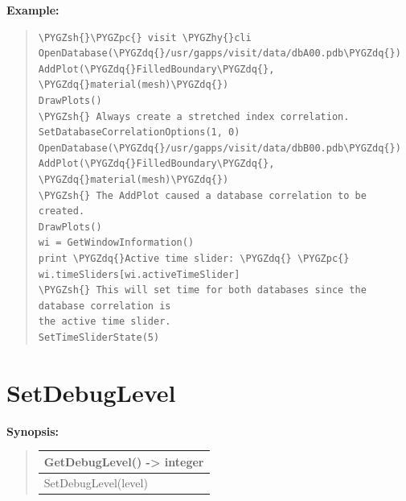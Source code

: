 \documentclass[letterpaper,10pt,english]{sphinxmanual}
\def\PYGZsh{\char`\#}
\def\PYGZpc{\char`\%}
\def\PYGZhy{\char`\-}
\def\PYGZdq{\char`\"}
\begin{document}
\begin{DUlineblock}{0em}
\item[] \textbf{Example:}
\item[] 
\end{DUlineblock}
\begin{quote}

\begin{Verbatim}[commandchars=\\\{\}]
\PYGZsh{}\PYGZpc{} visit \PYGZhy{}cli
OpenDatabase(\PYGZdq{}/usr/gapps/visit/data/dbA00.pdb\PYGZdq{})
AddPlot(\PYGZdq{}FilledBoundary\PYGZdq{}, \PYGZdq{}material(mesh)\PYGZdq{})
DrawPlots()
\PYGZsh{} Always create a stretched index correlation.
SetDatabaseCorrelationOptions(1, 0)
OpenDatabase(\PYGZdq{}/usr/gapps/visit/data/dbB00.pdb\PYGZdq{})
AddPlot(\PYGZdq{}FilledBoundary\PYGZdq{}, \PYGZdq{}material(mesh)\PYGZdq{})
\PYGZsh{} The AddPlot caused a database correlation to be created.
DrawPlots()
wi = GetWindowInformation()
print \PYGZdq{}Active time slider: \PYGZdq{} \PYGZpc{} wi.timeSliders[wi.activeTimeSlider]
\PYGZsh{} This will set time for both databases since the database correlation is
the active time slider.
SetTimeSliderState(5)
\end{Verbatim}
\end{quote}


\section{SetDebugLevel}
\label{functions:setdebuglevel}
\begin{DUlineblock}{0em}
\item[] \textbf{Synopsis:}
\end{DUlineblock}
\begin{quote}

\begin{tabulary}{\linewidth}{|L|}
\hline

GetDebugLevel() -\textgreater{} integer
\\
\hline
SetDebugLevel(level)
\\
\hline\end{tabulary}

\end{quote}
\end{document}

